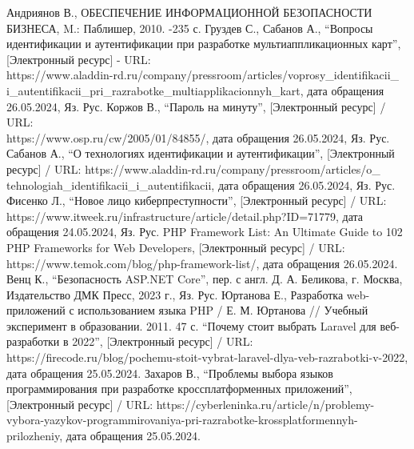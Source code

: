 \begin{thebibliography}{99}
   Андриянов В., ОБЕСПЕЧЕНИЕ ИНФОРМАЦИОННОЙ БЕЗОПАСНОСТИ БИЗНЕСА, M.: Паблишер, 2010. -235 с.
   Груздев С., Сабанов А., ``Вопросы идентификации и аутентификации при разработке мультиаппликационных карт'', [Электронный ресурс] -  URL:\\ https://www.aladdin-rd.ru/company/pressroom/articles/voprosy\_identifikacii\_\\i\_autentifikacii\_pri\_razrabotke\_multiapplikacionnyh\_kart, дата обращения 26.05.2024, Яз. Рус.
   Коржов В., ``Пароль на минуту'', [Электронный ресурс] / URL: \\https://www.osp.ru/cw/2005/01/84855/, дата обращения 26.05.2024, Яз. Рус.
   Сабанов А., ``О технологиях идентификации и аутентификации'', [Электронный ресурс] / URL: https://www.aladdin-rd.ru/company/pressroom/articles/o\_\\tehnologiah\_identifikacii\_i\_autentifikacii, дата обращения  26.05.2024, Яз. Рус.
   Фисенко Л., ``Новое лицо киберпреступности'', [Электронный ресурс] / URL:\\https://www.itweek.ru/infrastructure/article/detail.php?ID=71779, дата обращения 24.05.2024, Яз. Рус.
   PHP Framework List: An Ultimate Guide to 102 PHP Frameworks for Web Developers, [Электронный ресурс] / URL: https://www.temok.com/blog/php-framework-list/, дата обращения 26.05.2024.
   Венц К., ``Безопасность ASP.NET Core'', пер. с англ. Д. А. Беликова, г. Москва, Издательство ДМК Пресс, 2023 г., Яз. Рус.
   Юртанова Е., Разработка web-приложений с использованием языка PHP / Е. М. Юртанова // Учебный эксперимент в образовании. 2011. 47 с.
   ``Почему стоит выбрать Laravel для веб-разработки в 2022'', [Электронный ресурс] / URL: https://firecode.ru/blog/pochemu-stoit-vybrat-laravel-dlya-veb-razrabotki-v-2022, дата обращения 25.05.2024.
   Захаров В., ``Проблемы выбора языков программирования при разработке кроссплатформенных приложений'', [Электронный ресурс] /  URL: https://cyberleninka.ru/article/n/problemy-vybora-yazykov-programmirovaniya-pri-razrabotke-krossplatformennyh-prilozheniy, дата обращения 25.05.2024.
\end{thebibliography}

